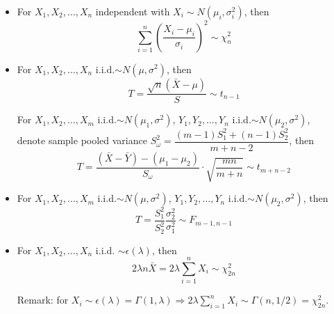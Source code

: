             
        \begin{itemize}
            \item For $X_1,X_2,\ldots,X_n$ independent with $X_i\sim N(\mu_i,\sigma^2_i)$, then
            \begin{equation}        
                \sum_{i=1}^n\left(\frac{X_i-\mu_i}{\sigma_i}\right)^2\sim \chi^2_n
            \end{equation}  
            \item For $X_1,X_2,\ldots,X_n$ i.i.d.$\sim N(\mu,\sigma^2)$, then
            \begin{equation}        
                T=\frac{\sqrt{n}(\bar{X}-\mu)}{S}\sim t_{n-1}   
            \end{equation}
            
            For $X_1,X_2,\ldots,X_m$ i.i.d.$\sim N(\mu_1,\sigma^2)$, $Y_1,Y_2,\ldots,Y_n$ i.i.d.$\sim N(\mu_2,\sigma^2)$, \\ denote sample pooled variance $S_{\omega}^2=\dfrac{(m-1)S^2_1+(n-1)S^2_2}{m+n-2}$, then
            \begin{equation}        
                T=\frac{(\bar{X}-\bar{Y})-(\mu_1-\mu_2)}{S_{\omega}}\cdot \sqrt{\frac{mn}{m+n}}\sim t_{m+n-2}
            \end{equation}
            \item For $X_1,X_2,\ldots,X_m$ i.i.d.$\sim N(\mu,\sigma^2)$, $Y_1,Y_2,\ldots,Y_n$ i.i.d.$\sim N(\mu_2,\sigma^2)$, then
            \begin{equation}        
                T=\frac{S_1^2}{S_2^2}\frac{\sigma^2_2}{\sigma^2_1}\sim F_{m-1,n-1}   
            \end{equation}
            \item For $X_1,X_2,\ldots,X_n$ i.i.d. $\sim \epsilon(\lambda)$, then
            \begin{equation}        
                2\lambda n\bar{X}=2\lambda\sum_{i=1}^nX_i \sim\chi^2_{2n} 
            \end{equation}

            Remark: for $X_i\sim\epsilon(\lambda)=\Gamma(1,\lambda)\Rightarrow 2\lambda\sum_{i=1}^nX_i\sim\Gamma(n,1/2)=\chi^2_{2n}$. 
        \end{itemize}

